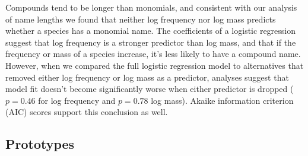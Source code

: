 \documentclass[10pt,letterpaper]{article}
\begin{document}
Compounds tend to be longer than monomials, and consistent with our analysis of name lengths we found 
that neither log frequency nor log mass predicts whether a species has a monomial name. The coefficients of a logistic regression suggest that log frequency is a stronger predictor than log mass, and that if the frequency or mass of a species increase, it’s less likely to have a compound name. However, when we compared the full logistic regression model to alternatives that removed either log frequency or log mass as a predictor, analyses suggest that model fit doesn’t become significantly worse when either predictor is dropped ($p=0.46$ for log frequency and $p=0.78$ log mass).  Akaike information criterion (AIC) scores support this conclusion as well. 





\subsection{Prototypes}

\end{document}
